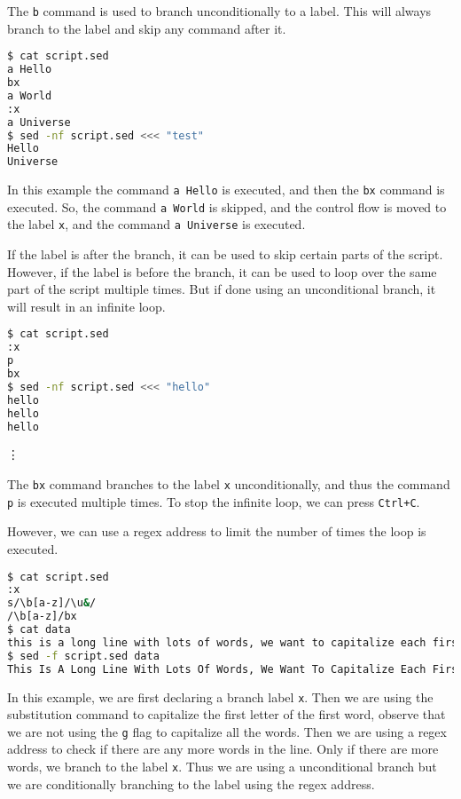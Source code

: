 The \lstinline|b| command is used to branch unconditionally to a label.
This will always branch to the label and skip any command after it.

\begin{lstlisting}[language=bash]
$ cat script.sed
a Hello
bx
a World
:x
a Universe
$ sed -nf script.sed <<< "test"
Hello
Universe
\end{lstlisting}

In this example the command \lstinline|a Hello| is executed, and then the \lstinline|bx| command is executed.
So, the command \lstinline|a World| is skipped, and the control flow is moved to the label \lstinline|x|, and the command \lstinline|a Universe| is executed.

If the label is after the branch, it can be used to skip certain parts of the script.
However, if the label is before the branch, it can be used to loop over the same part of the script multiple times.
But if done using an unconditional branch, it will result in an infinite loop.

\begin{lstlisting}[language=bash]
$ cat script.sed
:x
p
bx
$ sed -nf script.sed <<< "hello"
hello
hello
hello
\end{lstlisting}
\vdots

The \lstinline|bx| command branches to the label \lstinline|x| unconditionally, and thus the command \lstinline|p| is executed multiple times.
To stop the infinite loop, we can press \lstinline|Ctrl+C|.

However, we can use a regex address to limit the number of times the loop is executed.

\begin{lstlisting}[language=bash]
$ cat script.sed
:x
s/\b[a-z]/\u&/
/\b[a-z]/bx
$ cat data
this is a long line with lots of words, we want to capitalize each first letter of a word.
$ sed -f script.sed data
This Is A Long Line With Lots Of Words, We Want To Capitalize Each First Letter Of A Word.
\end{lstlisting}

In this example, we are first declaring a branch label \lstinline|x|.
Then we are using the substitution command to capitalize the first letter of the first word,
observe that we are not using the \lstinline|g| flag to capitalize all the words.
Then we are using a regex address to check if there are any more words in the line.
Only if there are more words, we branch to the label \lstinline|x|.
Thus we are using a unconditional branch but we are conditionally branching to the label using the regex address.

